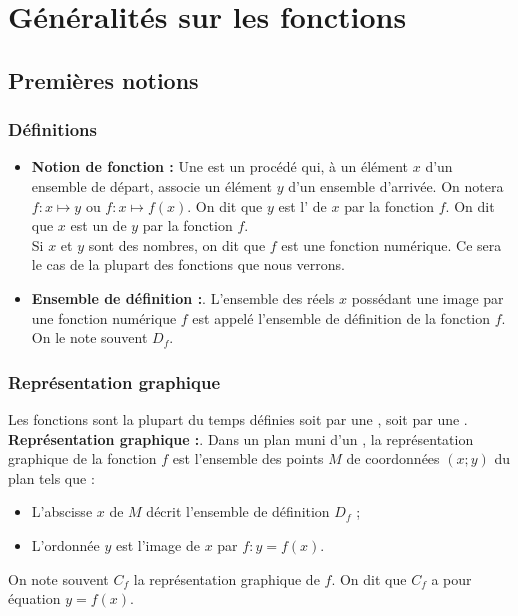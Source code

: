 \documentclass[12pt,a4paper,french]{book}
\begin{document}
\tableofcontents

\chapter{Généralités sur les fonctions}

\section{Premières notions}

\subsection{Définitions}

\begin{defns}
\begin{itemize}
 \item \textbf{Notion de fonction :} Une  est un procédé qui, à un élément \( x \) d’un ensemble de départ, associe un  élément \( y \) d’un ensemble d’arrivée. On notera \( f : x \mapsto y \) ou \( f : x \mapsto f(x) \). On dit que \( y \) est l’ de \( x \) par la fonction $f$. On dit que \( x \) est un  de \( y \) par la fonction $f$.\\
  
 Si \( x \) et \( y \) sont des nombres, on dit que \( f \) est une fonction numérique. Ce sera le cas de la plupart des fonctions que nous verrons.
    
    \item \textbf{ Ensemble de définition :}. L’ensemble des réels \( x \) possédant une image par une fonction numérique \( f \) est appelé l’ensemble de définition de la fonction \( f \). On le note souvent \( D_f \).
\end{itemize}
\end{defns}


\subsection{Représentation graphique}

\begin{defn}
Les fonctions sont la plupart du temps définies soit par une , soit par une .\\

\textbf{Représentation graphique :}. Dans un plan muni d’un , la représentation graphique de la fonction \( f \) est l’ensemble des points \( M \) de coordonnées \( (x ; y) \) du plan tels que :
\begin{itemize}
    \item L’abscisse \( x \) de \( M \) décrit l’ensemble de définition \( D_f \) ;
    \item L’ordonnée \( y \) est l’image de \( x \) par \( f : y = f(x) \).
\end{itemize}
    
On note souvent \( C_f \) la représentation graphique de \( f \). On dit que \( C_f \) a pour équation \( y = f(x) \).
\end{defn}
\end{document}
